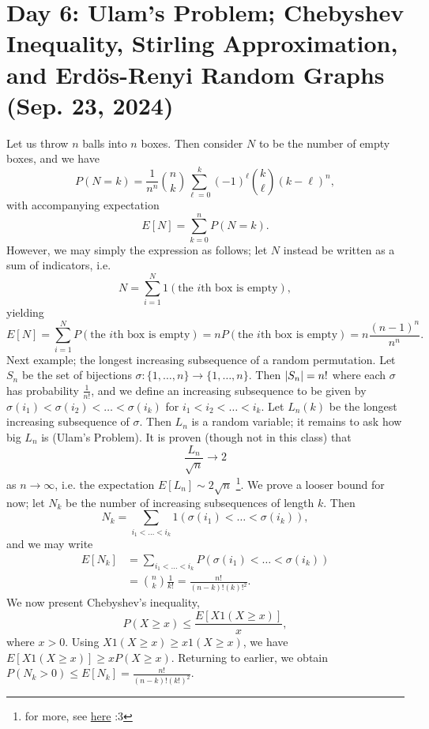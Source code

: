 \section{Day 6: Ulam's Problem; Chebyshev Inequality, Stirling Approximation, and Erd\"os-Renyi Random Graphs (Sep. 23, 2024)}
Let us throw $n$ balls into $n$ boxes. Then consider $N$ to be the number of empty boxes, and we have
\[ P(N = k) = \frac{1}{n^n} \binom{n}{k} \sum_{\ell = 0}^k (-1)^\ell \binom{k}{\ell} (k - \ell)^n, \]
with accompanying expectation
\[ E[N] = \sum_{k = 0}^n P(N = k). \]
However, we may simply the expression as follows; let $N$ instead be written as a sum of indicators, i.e.
\[ N = \sum_{i=1}^N 1(\text{the } i\text{th box is empty}), \]
yielding
\[ E[N] = \sum_{i=1}^N P(\text{the } i\text{th box is empty}) = nP(\text{the } i\text{th box is empty}) = n \frac{(n-1)^n}{n^n}. \]
Next example; the longest increasing subsequence of a random permutation. Let $S_n$ be the set of bijections $\sigma : \{1, \dots, n\} \to \{1, \dots, n\}$. Then $\left\lvert S_n \right\rvert = n!$ where each $\sigma$ has probability $\frac{1}{n!}$, and we define an increasing subsequence to be given by $\sigma(i_1) < \sigma(i_2) < \dots < \sigma(i_k)$ for $i_1 < i_2 < \dots < i_k$. Let $L_n(k)$ be the longest increasing subsequence of $\sigma$. Then $L_n$ is a random variable; it remains to ask how big $L_n$ is (Ulam's Problem). It is proven (though not in this class) that
\[ \frac{L_n}{\sqrt{n}} \to 2 \]
as $n \to \infty$, i.e. the expectation $E[L_n] \sim 2\sqrt{n}$ \footnote{for more, see \href{https://www.ams.org/journals/jams/1999-12-04/S0894-0347-99-00307-0/S0894-0347-99-00307-0.pdf}{here} :3}.
\medskip\newline
\noindent We prove a looser bound for now; let $N_k$ be the number of increasing subsequences of length $k$. Then
\[ N_k = \sum_{i_1 < \dots < i_k} 1(\sigma(i_1) < \dots < \sigma(i_k)), \]
and we may write
\begin{align*}
    E[N_k] &= \sum_{i_1 < \dots < i_k} P(\sigma(i_1) < \dots < \sigma(i_k)) \\
    &= \binom{n}{k} \frac{1}{k!} = \frac{n!}{(n-k)! (k)!^2}.
\end{align*}
We now present Chebyshev's inequality,
\[ P(X \geq x) \leq \frac{E[X 1(X \geq x)]}{x}, \]
where $x > 0$. Using $X 1(X \geq x) \geq x 1(X \geq x)$, we have $E[X 1(X \geq x)] \geq x P(X \geq x)$. Returning to earlier, we obtain $P(N_k > 0) \leq E[N_k] = \frac{n!}{(n-k)!(k!)^2}$.

